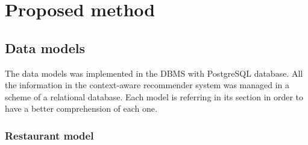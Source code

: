 \chapter{Proposed method}


\section{Data models} 

The data models was implemented in the DBMS with PostgreSQL database.
All the information in the context-aware recommender system was
managed in a scheme of a relational database. Each model is referring
in its section in order to have a better comprehension of each one.

\subsection{Restaurant model} 

